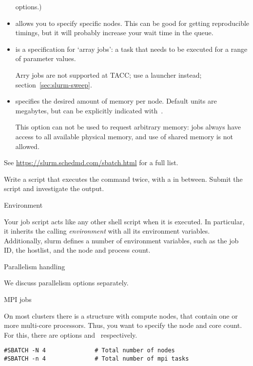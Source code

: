 \begin{itemize}
  options.)
\item {} allows you to specify specific nodes. This can be
  good for getting reproducible timings, but it will probably increase
  your wait time in the queue.
\item {} is a specification for `array jobs': a task that needs
  to be executed for a range of parameter values.
  \begin{taccnote}
  Arry jobs are not supported at TACC; use a launcher instead;
  section~\ref{sec:slurm-sweep}.
  \end{taccnote}
\item {} specifies the desired amount of memory per node.
  Default units are megabytes, but can be explicitly indicated
  with~.
  \begin{taccnote}
    This option can not be used to request arbitrary memory:
    jobs always have access to all available physical memory,
    and use of shared memory is not allowed.
  \end{taccnote}
\end{itemize}
See \url{https://slurm.schedmd.com/sbatch.html} for a full list.

\begin{exercise}
  Write a script that executes the  command twice,
  with a  in between.
  Submit the script and investigate the output.
\end{exercise}

 {Environment}

Your job script acts like any other shell script when it is executed.
In particular, it inherits the calling
\emph{environment}
with all its environment variables.
Additionally, slurm defines a number of environment variables,
such as the job ID, the hostlist, and the node and process count.

 {Parallelism handling}
\label{sec:slurm-par-opt}

We discuss parallelism options separately.

 {MPI jobs}

On most clusters there is a structure with compute nodes,
that contain one or more multi-core processors.
Thus, you want to specify the node and core count.
For this, there are options  and~ respectively.

\begin{verbatim}
#SBATCH -N 4              # Total number of nodes
#SBATCH -n 4              # Total number of mpi tasks
\end{verbatim}

